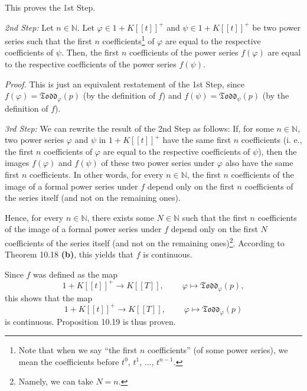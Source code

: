 \documentclass[numbers=enddot,12pt,final,onecolumn,notitlepage]{scrartcl}%
\begin{document}
This proves the 1st Step.

\textit{2nd Step:} Let $n\in\mathbb{N}$. Let $\varphi\in1+K\left[  \left[
t\right]  \right]  ^{+}$ and $\psi\in1+K\left[  \left[  t\right]  \right]
^{+}$ be two power series such that the first $n$ coefficients\footnote{Note
that when we say ``the first $n$ coefficients'' (of some power series), we mean
the coefficients before $t^{0}$, $t^{1}$, $...$, $t^{n-1}$.} of $\varphi$ are
equal to the respective coefficients of $\psi$. Then, the first $n$
coefficients of the power series $f\left(  \varphi\right)  $ are equal to the
respective coefficients of the power series $f\left(  \psi\right)  $.

\textit{Proof.} This is just an equivalent restatement of the 1st Step, since
$f\left(  \varphi\right)  =\mathfrak{Todd}_{\varphi}\left(  p\right)  $ (by
the definition of $f$) and $f\left(  \psi\right)  =\mathfrak{Todd}_{\psi
}\left(  p\right)  $ (by the definition of $f$).

\textit{3rd Step:} We can rewrite the result of the 2nd Step as follows: If,
for some $n\in\mathbb{N}$, two power series $\varphi$ and $\psi$ in
$1+K\left[  \left[  t\right]  \right]  ^{+}$ have the same first $n$
coefficients (i. e., the first $n$ coefficients of $\varphi$ are equal to the
respective coefficients of $\psi$), then the images $f\left(  \varphi\right)
$ and $f\left(  \psi\right)  $ of these two power series under $\varphi$ also
have the same first $n$ coefficients. In other words, for every $n\in
\mathbb{N}$, the first $n$ coefficients of the image of a formal power series
under $f$ depend only on the first $n$ coefficients of the series itself (and
not on the remaining ones).

Hence, for every $n\in\mathbb{N}$, there exists some $N\in\mathbb{N}$ such
that the first $n$ coefficients of the image of a formal power series under
$f$ depend only on the first $N$ coefficients of the series itself (and not on
the remaining ones)\footnote{Namely, we can take $N=n$.}. According to Theorem
10.18 \textbf{(b)}, this yields that $f$ is continuous.

Since $f$ was defined as the map%
\[
1+K\left[  \left[  t\right]  \right]  ^{+}\rightarrow K\left[  \left[
T\right]  \right]  ,\ \ \ \ \ \ \ \ \ \ \varphi\mapsto\mathfrak{Todd}%
_{\varphi}\left(  p\right)  ,
\]
this shows that the map%
\[
1+K\left[  \left[  t\right]  \right]  ^{+}\rightarrow K\left[  \left[
T\right]  \right]  ,\ \ \ \ \ \ \ \ \ \ \varphi\mapsto\mathfrak{Todd}%
_{\varphi}\left(  p\right)
\]
is continuous. Proposition 10.19 is thus proven.
\end{document}
